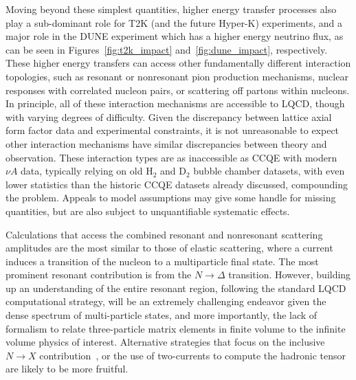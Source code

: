 \documentclass{ar-1col}
\def\D{\Delta}
\begin{document}
Moving beyond these simplest quantities, higher energy transfer processes also play a sub-dominant role for T2K (and the future
Hyper-K) experiments, and a major role in the DUNE experiment which has a higher energy neutrino
flux, as can be seen in Figures~\ref{fig:t2k_impact} and~\ref{fig:dune_impact}, respectively.
These higher energy transfers can access other fundamentally different interaction topologies,
 such as resonant or nonresonant pion production mechanisms,
 nuclear responses with correlated nucleon pairs,
 or scattering off partons within nucleons.
In principle, all of these interaction mechanisms are accessible to LQCD,
 though with varying degrees of difficulty.
Given the discrepancy between lattice axial form factor data and experimental constraints,
 it is not unreasonable to expect other interaction mechanisms have similar discrepancies
 between theory and observation.
These interaction types are as inaccessible as CCQE with modern $\nu A$ data, typically relying on old H$_2$ and D$_2$ bubble chamber datasets, with even lower statistics than the historic CCQE datasets already discussed, compounding the problem.
Appeals to model assumptions may give some handle for missing quantities,
 but are also subject to unquantifiable systematic effects.

Calculations that access the combined resonant and nonresonant scattering amplitudes
 are the most similar to those of elastic scattering,
 where a current induces a transition of the nucleon to a multiparticle final state.
The most prominent resonant contribution is from the $N\rightarrow\D$ transition.
However, building up an understanding of the entire resonant region, following the standard LQCD computational strategy, will be an extremely challenging endeavor given the dense spectrum of multi-particle states, and more importantly, the lack of formalism to relate three-particle matrix elements in finite volume to the infinite volume physics of interest.
Alternative strategies that focus on the inclusive $N\rightarrow X$ contribution~\cite{Hansen:2017mnd,Gambino:2020crt,Fukaya:2020wpp,Bruno:2020kyl}, or the use of two-currents to compute the hadronic tensor~\cite{Liu:1993cv,Liang:2019frk} are likely to be more fruitful.
\end{document}
